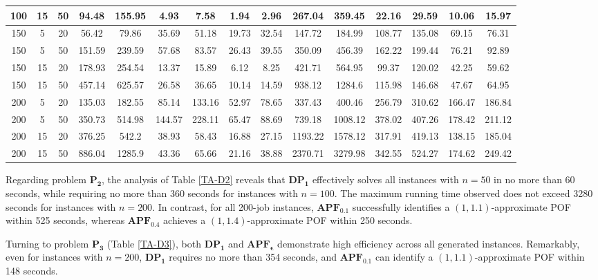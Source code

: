 \documentclass[12pt]{article}
\begin{document}
\begin{sloppypar}
\begin{table}[H]
\begin{center}
\begin{tabular}{|ccc|cc|cc|cc|cc|cc|cc|}
100 & 15 & 50 & 94.48 &	155.95 & 4.93 &	7.58 & 1.94	& 2.96 & 267.04 & 359.45 & 22.16 & 29.59 & 10.06 & 15.97 \\ \hline
150 & 5 & 20 & 56.42 & 79.86 & 35.69	& 51.18	& 19.73 & 32.54 & 147.72 & 184.99 &	108.77 & 135.08	& 69.15 &	76.31 \\ \hline
150 & 5 & 50 & 151.59 &	239.59 & 57.68 & 83.57 & 26.43 & 39.55 & 350.09	& 456.39 & 162.22 &	199.44 & 76.21 &	92.89 \\ \hline
150 & 15 & 20 & 178.93 & 254.54 & 13.37 & 15.89 & 6.12 & 8.25 & 421.71 & 564.95 & 99.37 & 120.02 & 42.25 &	59.62 \\ \hline
150 & 15 & 50 & 457.14 & 625.57 & 26.58 & 36.65 & 10.14 & 14.59 & 938.12 & 1284.6 & 115.98 & 146.68 
& 47.67 & 64.95 \\ \hline
200 & 5 & 20 & 135.03 &	182.55 & 85.14 & 133.16	& 52.97 & 78.65 & 337.43 & 400.46 & 256.79 & 310.62 & 166.47 & 186.84 \\ \hline
200 & 5 & 50 & 350.73 &	514.98 & 144.57 & 228.11 & 65.47 & 88.69 & 739.18 &	1008.12 & 378.02 & 407.26 & 178.42 & 211.12 \\ \hline
200 & 15 & 20 & 376.25 & 542.2 & 38.93 & 58.43 & 16.88 & 27.15 & 1193.22 &	1578.12	& 317.91 & 419.13 & 138.15 & 185.04 \\ \hline
200 & 15 & 50 & 886.04 & 1285.9	& 43.36	& 65.66 & 21.16 & 38.88 & 2370.71 & 3279.98 & 342.55 & 524.27 & 174.62 & 249.42 \\ \hline
\end{tabular}
\end{center}
\end{table}

Regarding problem $\mathbf{P_2}$, the analysis of Table \ref{TA-D2} reveals that $\mathbf{DP_1}$ effectively solves all instances with $n=50$ in no more than 60 seconds, while requiring no more than 360 seconds for instances with $n=100$. The maximum running time observed does not exceed 3280 seconds for instances with $n=200$. In contrast, for all 200-job instances, $\mathbf{APF_{0.1}}$ successfully identifies a $(1, 1.1)$-approximate POF within 525 seconds, whereas $\mathbf{APF_{0.4}}$ achieves a $(1, 1.4)$-approximate POF within 250 seconds.

Turning to problem $\mathbf{P_3}$ (Table \ref{TA-D3}), both $\mathbf{DP_1}$ and $\mathbf{APF_{\epsilon}}$ demonstrate high efficiency across all generated instances. Remarkably, even for instances with $n=200$, $\mathbf{DP_1}$ requires no more than 354 seconds, and $\mathbf{APF_{0.1}}$ can identify a $(1, 1.1)$-approximate POF within 148 seconds.


\end{sloppypar}
\end{document}
